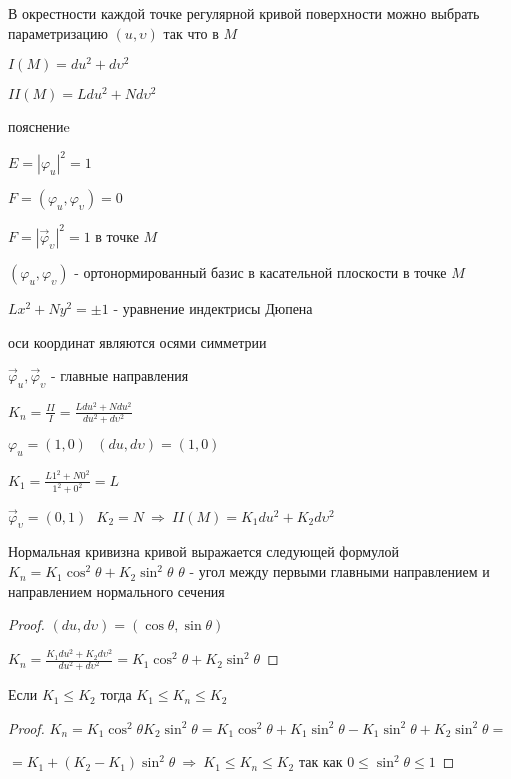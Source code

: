 \begin{theorem}
  В окрестности каждой точке регулярной кривой поверхности можно выбрать
  параметризацию $(u, \upsilon)$ так что в $M$

  $I(M) = du^2 + d\upsilon^2$

  $II(M) = Ldu^2 + Nd\upsilon^2$

  пояснениe

  $E = |\varphi_u|^2 = 1$

  $F = (\varphi_u, \varphi_{\upsilon}) = 0$

  $F = |\vec \varphi_{\upsilon}|^2 = 1$ в точке $M$

  $(\varphi_u, \varphi_{\upsilon})$ - ортонормированный базис в касательной
  плоскости в точке $M$

  $Lx^2 + Ny^2 = \pm 1$ - уравнение индектрисы Дюпена

  оси координат являются осями симметрии

  $\vec \varphi_u, \vec \varphi_{\upsilon}$ - главные направления

  $K_n = \frac{II}{I} = \frac{Ldu^2 + Ndu^2}{du^2 + d\upsilon^2}$

  $\varphi_u = (1,0) ~~~ (du, d\upsilon) = (1,0)$

  $K_1 = \frac{L1^2 + N0^2}{1^2 + 0^2} = L$

  $\vec \varphi_{\upsilon} = (0,1) ~~~ K_2 = N ~ \Rightarrow ~ II(M) =
  K_1 du^2 + K_2d\upsilon^2$
\end{theorem}

\begin{theorem}[Эйлера]
  Нормальная кривизна кривой выражается следующей формулой
  $K_n = K_1 \cos^2 \theta +K_2 \sin^2 \theta$ $\theta$ - угол между первыми
  главными направлением и направлением  нормального сечения
\end{theorem}

\begin{proof}
  $(du, d\upsilon) = (\cos \theta, \sin \theta)$

  $K_n = \frac{K_1du^2 + K_2d\upsilon^2}{du^2 + d\upsilon^2} = K_1\cos^2 \theta
  + K_2 \sin^2 \theta$
\end{proof}

\begin{block}[Следствие]
  Если $K_1 \le K_2$ тогда $K_1 \le K_n \le K_2$
\end{block}

\begin{proof}
  $K_n = K_1 \cos^2 \theta K_2 \sin^2 \theta = K_1 \cos^2 \theta +
  K_1 \sin^2 \theta - K_1 \sin^2 \theta + K_2 \sin^2 \theta =$

  $= K_1 + (K_2 - K_1)\sin^2 \theta ~ \Rightarrow ~ K_1 \le K_n \le K_2$
  так как $0 \le \sin^2 \theta \le 1$
\end{proof}

